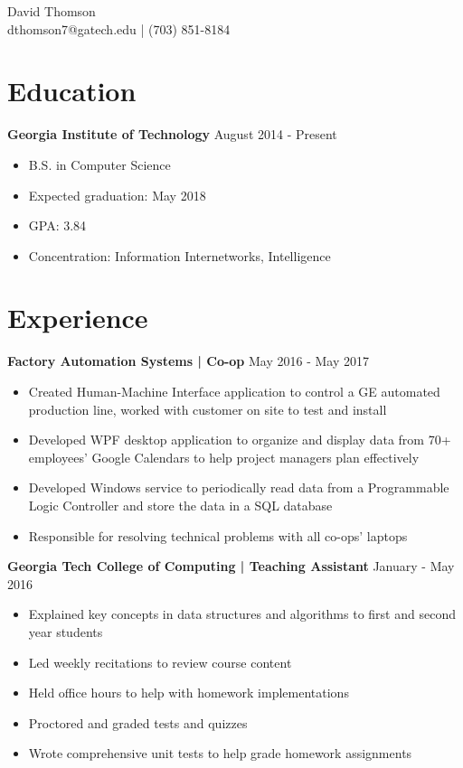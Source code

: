 \documentclass[10pt]{article}
\newcommand{\pipe}{| }
\begin{document}
\begin{center}
\vspace*{0.3em}
{\huge David Thomson} \\
\vspace*{1em}
dthomson7@gatech.edu \pipe (703) 851-8184
\end{center}

\section*{Education}
\textbf{Georgia Institute of Technology} \hfill August 2014 - Present
\begin{itemize}
    \item B.S. in Computer Science
    \item Expected graduation: May 2018
    \item GPA: 3.84
    \item Concentration: Information Internetworks, Intelligence
\end{itemize}

\section*{Experience}
\textbf{Factory Automation Systems \pipe Co-op} \hfill May 2016 - May 2017
\begin{itemize}
    \item Created Human-Machine Interface application to control a GE automated production line, worked with customer on site to test and install
    
    \item Developed WPF desktop application to organize and display data from 70+ employees' Google Calendars to help project managers plan effectively
    \item Developed Windows service to periodically read data from a Programmable Logic Controller and store the data in a SQL database
    \item Responsible for resolving technical problems with all co-ops' laptops
\end{itemize}

\vspace{3pt}

\textbf{Georgia Tech College of Computing \pipe Teaching Assistant} \hfill January - May 2016
\begin{itemize}
    \item Explained key concepts in data structures and algorithms to first and second year students
    \item Led weekly recitations to review course content
    \item Held office hours to help with homework implementations
    \item Proctored and graded tests and quizzes
    \item Wrote comprehensive unit tests to help grade homework assignments
\end{itemize}
\end{document}
